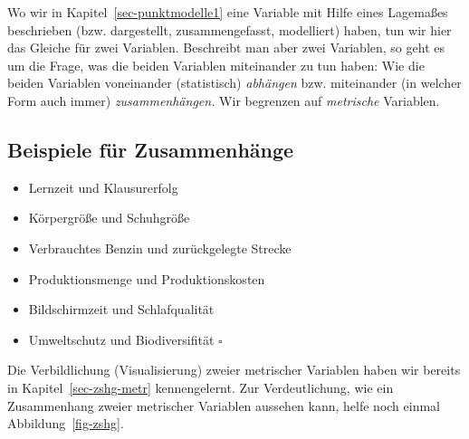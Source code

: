 \documentclass[
  a4paper,
]{scrbook}
\providecommand{\tightlist}{%
  \setlength{\itemsep}{0pt}\setlength{\parskip}{0pt}}\usepackage{longtable,booktabs,array}
\theoremstyle{definition}
\theoremstyle{definition}
\theoremstyle{definition}
\theoremstyle{remark}
\begin{document}
Wo wir in Kapitel~\ref{sec-punktmodelle1} eine Variable mit Hilfe eines
Lagemaßes beschrieben (bzw. dargestellt, zusammengefasst, modelliert)
haben, tun wir hier das Gleiche für zwei Variablen. Beschreibt man aber
zwei Variablen, so geht es um die Frage, was die beiden Variablen
miteinander zu tun haben: Wie die beiden Variablen voneinander
(statistisch) \emph{abhängen} bzw. miteinander (in welcher Form auch
immer) \emph{zusammenhängen.} Wir begrenzen auf \emph{metrische}
Variablen.

\subsection{Beispiele für
Zusammenhänge}\label{beispiele-fuxfcr-zusammenhuxe4nge}

\begin{itemize}
\tightlist
\item
  Lernzeit und Klausurerfolg
\item
  Körpergröße und Schuhgröße
\item
  Verbrauchtes Benzin und zurückgelegte Strecke
\item
  Produktionsmenge und Produktionskosten
\item
  Bildschirmzeit und Schlafqualität
\item
  Umweltschutz und Biodiversifität \(\square\)
\end{itemize}

Die Verbildlichung (Visualisierung) zweier metrischer Variablen haben
wir bereits in Kapitel~\ref{sec-zshg-metr} kennengelernt. Zur
Verdeutlichung, wie ein Zusammenhang zweier metrischer Variablen
aussehen kann, helfe noch einmal Abbildung~\ref{fig-zshg}.
\end{document}

